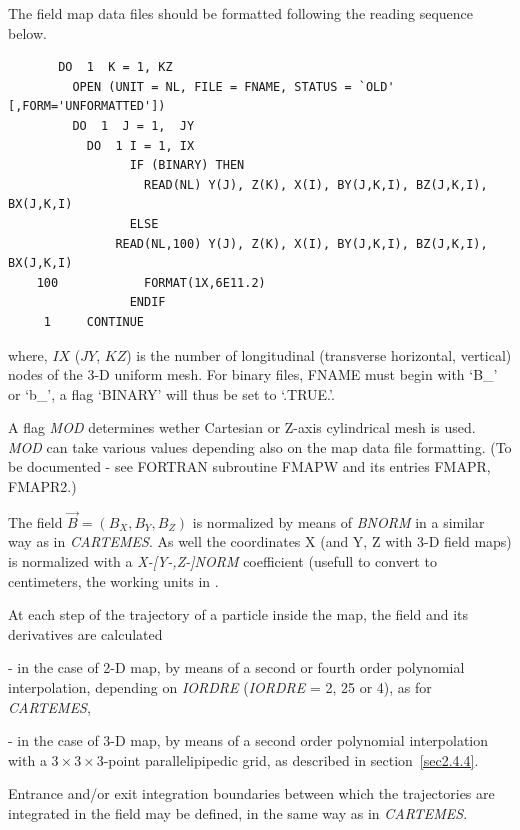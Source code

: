 \noindent The field map data files should be formatted following the \FORTRAN reading 
sequence below.

{\footnotesize
\begin{verbatim}
	   DO  1  K = 1, KZ
	     OPEN (UNIT = NL, FILE = FNAME, STATUS = `OLD' [,FORM='UNFORMATTED'])
	     DO  1  J = 1,  JY  
	       DO  1 I = 1, IX
                 IF (BINARY) THEN
                   READ(NL) Y(J), Z(K), X(I), BY(J,K,I), BZ(J,K,I), BX(J,K,I)
                 ELSE
	           READ(NL,100) Y(J), Z(K), X(I), BY(J,K,I), BZ(J,K,I), BX(J,K,I)
    100	           FORMAT(1X,6E11.2)
                 ENDIF
     1     CONTINUE
\end{verbatim}}
\medskip

\noindent where, $IX$ ($JY$, $KZ$)  is   the number of longitudinal 
(transverse horizontal, vertical) nodes of the 3-D uniform mesh. For binary files, 
FNAME must begin with  \mbox{`B\_'} or  \mbox{`b\_'}, a flag  `BINARY' will thus be set to `.TRUE.'.  

A flag \textsl{MOD} determines wether Cartesian or Z-axis cylindrical mesh is used. \textsl{MOD} can 
take various values depending also on the map data file formatting. (To be documented - see FORTRAN 
subroutine FMAPW and its entries FMAPR, FMAPR2.)

\bigskip

\noindent The field $ \vec  B=(B_X,B_Y,B_Z) $ is normalized by means of 
\textsl{BNORM} in a similar way as in \textsl{CARTEMES}.  
 As well the  coordinates  X (and Y, Z with 3-D field maps) is normalized with 
a  \textsl{X-[Y-,Z-]NORM} coefficient (usefull to convert to centimeters, the working units in  \zgoubi. 


\bigskip

\noindent At each step of the trajectory of a particle inside the map, the
field and its derivatives are calculated 

 - in the case of 2-D map,  by means of a second or fourth order polynomial interpolation, 
depending on \textsl{IORDRE} (\textsl{IORDRE} = 2, 25 or 4), as for 
\textsl{CARTEMES}, 

 - in the case of 3-D map, by means of a second order polynomial interpolation with a 
$3  \times   3   \times   3$-point parallelipipedic grid, as described in 
section~\ref{sec2.4.4}. 
\bigskip

\noindent Entrance and/or exit integration boundaries between which the trajectories
are integrated in the field may be defined, in the same way as in  \textsl{CARTEMES}. 

